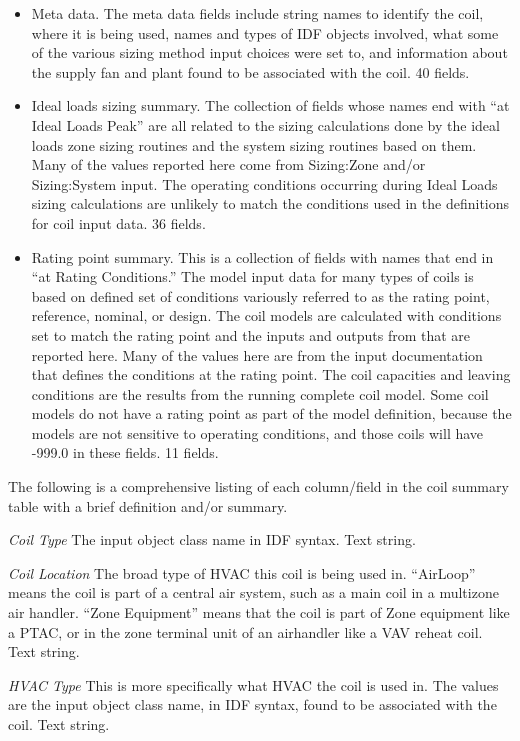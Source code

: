 \begin{itemize}
\item
  Meta data.  The meta data fields include string names to identify the coil, where it is being used, names and types of IDF objects involved, what some of the various sizing method input choices were set to, and information about the supply fan and plant found to be associated with the coil.  40 fields. 
\item
  Ideal loads sizing summary. The collection of fields whose names end with ``at Ideal Loads Peak'' are all related to the sizing calculations done by the ideal loads zone sizing routines and the system sizing routines based on them.  Many of the values reported here come from Sizing:Zone and/or Sizing:System input.  The operating conditions occurring during Ideal Loads sizing calculations are unlikely to match the conditions used in the definitions for coil input data.  36 fields.
\item
  Rating point summary.  This is a collection of fields with names that end in ``at Rating Conditions.''  The model input data for many types of coils is based on defined set of conditions variously referred to as the rating point, reference, nominal, or design.  The coil models are calculated with conditions set to match the rating point and the inputs and outputs from that are reported here.  Many of the values here are from the input documentation that defines the conditions at the rating point. The coil capacities and leaving conditions are the results from the running complete coil model. Some coil models do not have a rating point as part of the model definition, because the models are not sensitive to operating conditions, and those coils will have -999.0 in these fields. 11 fields.
\end{itemize}

The following is a comprehensive listing of each column/field in the coil summary table with a brief definition and/or summary.

\emph{Coil Type} The input object class name in IDF syntax. Text string. 

\emph{Coil Location} The broad type of HVAC this coil is being used in.  ``AirLoop'' means the coil is part of a central air system, such as a main coil in a multizone air handler.  ``Zone Equipment'' means that the coil is part of Zone equipment like a PTAC, or in the zone terminal unit of an airhandler like a VAV reheat coil.   Text string.

\emph{HVAC Type} This is more specifically what HVAC the coil is used in. The values are the input object class name, in IDF syntax, found to be associated with the coil. Text string.

